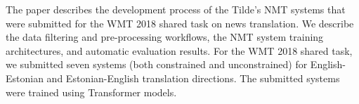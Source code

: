 The paper describes the development process of the Tilde's NMT systems that were submitted for the WMT 2018 shared task on news translation. We describe the data filtering and pre-processing workflows, the NMT system training architectures, and automatic evaluation results. For the WMT 2018 shared task, we submitted seven systems (both constrained and unconstrained) for English-Estonian and Estonian-English translation directions. The submitted systems were trained using Transformer models.
